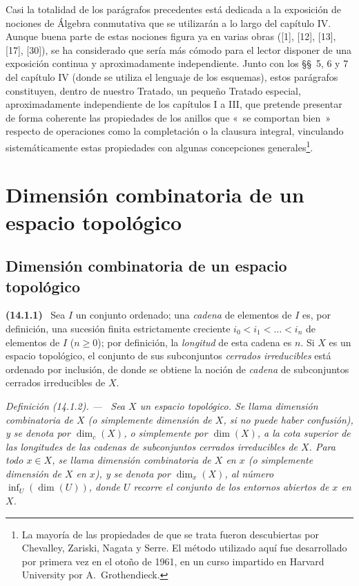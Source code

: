 \documentclass[10pt,oneside]{book}
\makeatletter
\newcommand{\setmanualcurrentlabel}[1]{\def\@currentlabel{#1}}
\newcommand{\oldpage}[2][]{%
  \setcounter{footnote}{0}%
  \marginpar{\scriptsize\textbf{#1}~|~#2}\ignorespaces}
\newenvironment{env}[1][]{\setmanualcurrentlabel{#1}\par\medskip\noindent\textbf{(#1)}\ }{\par}
\newenvironment{definition}[1][]{%
  \setmanualcurrentlabel{#1}\par\medskip\noindent\itshape Definición (#1). ---\ }{\par}
\makeatother
\begin{document}
Casi la totalidad de los parágrafos precedentes está dedicada a la exposición
de nociones de Álgebra conmutativa que se utilizarán a lo largo del capítulo
IV. Aunque buena parte de estas nociones figura ya en varias obras ([1], [12],
[13], [17], [30]), se ha considerado que sería más cómodo para el lector
disponer de una exposición continua y aproximadamente independiente. Junto con
los \S\S~5, 6 y 7 del capítulo IV (donde se utiliza el lenguaje de los
esquemas), estos parágrafos constituyen, dentro de nuestro Tratado, un pequeño
Tratado especial, aproximadamente independiente de los capítulos I a III, que
pretende presentar de forma coherente las propiedades de los anillos que «~se
comportan bien~» respecto de operaciones como la completación o la clausura
integral, vinculando sistemáticamente estas propiedades con algunas
concepciones generales\footnote{La mayoría de las propiedades de que se trata
fueron descubiertas por Chevalley, Zariski, Nagata y Serre. El método utilizado
aquí fue desarrollado por primera vez en el otoño de 1961, en un curso impartido
en Harvard University por A.~Grothendieck.}.

\setcounter{section}{13}
\section{Dimensión combinatoria de un espacio topológico}
\label{section:0.14-es}

\setcounter{subsection}{0}
\subsection{Dimensión combinatoria de un espacio topológico}
\label{subsection:0.14.1-es}

\oldpage[0\textsubscript{IV-1}]{6}
\begin{env}[14.1.1]
\label{0.14.1.1-es}
Sea $I$ un conjunto ordenado; una \emph{cadena} de elementos de $I$ es, por
definición, una sucesión finita estrictamente creciente
$i_0<i_1<\ldots<i_n$ de elementos de $I$ ($n\geq 0$); por definición, la
\emph{longitud} de esta cadena es $n$. Si $X$ es un espacio topológico, el
conjunto de sus subconjuntos \emph{cerrados irreducibles} está ordenado por
inclusión, de donde se obtiene la noción de \emph{cadena} de subconjuntos
cerrados irreducibles de $X$.
\end{env}

\begin{definition}[14.1.2]
\label{0.14.1.2-es}
Sea $X$ un espacio topológico. Se llama dimensión combinatoria de $X$
\textup{(o simplemente} dimensión de $X$, \textup{si no puede haber confusión)}, y se
denota por $\dim_c(X)$, o simplemente por $\dim(X)$, a la cota superior de las
longitudes de las cadenas de subconjuntos cerrados irreducibles de $X$. Para
todo $x\in X$, se llama dimensión combinatoria de $X$ en $x$ \textup{(o
simplemente} dimensión de $X$ en $x$), y se denota por $\dim_x(X)$, al
número $\inf_U(\dim(U))$, donde $U$ recorre el conjunto de los entornos
abiertos de $x$ en $X$.
\end{definition}
\end{document}
